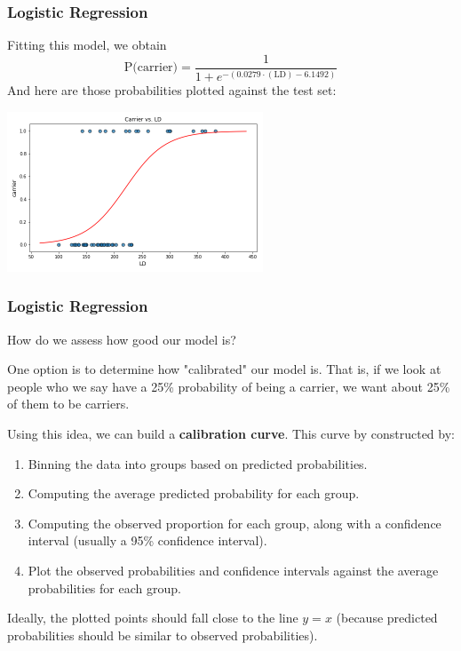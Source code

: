 \documentclass[11pt, table]{beamer}
\begin{document}
\begin{frame}
\frametitle{Logistic Regression}
Fitting this model, we obtain
$$\text{P(carrier)} = \frac{1}{1 + e^{-(0.0279\cdot(\text{LD}) - 6.1492)}}$$
And here are those probabilities plotted against the test set:
\begin{center}
	\includegraphics[width = 3in]{images/Dystrophy/scatter_03.png}
\end{center}

\end{frame}

\begin{frame}
\frametitle{Logistic Regression}
How do we assess how good our model is? 

One option is to determine how "calibrated" our model is. That is, if we look at people who we say have a 25\% probability of being a carrier, we want about 25\% of them to be carriers.
\vspace{0.1in}

Using this idea, we can build a \textbf{calibration curve}. This curve by constructed by:
\begin{enumerate}
	\item Binning the data into groups based on predicted probabilities.
	\item Computing the average predicted probability for each group.
	\item Computing the observed proportion for each group, along with a confidence interval (usually a 95\% confidence interval).
	\item Plot the observed probabilities and confidence intervals against the average probabilities for each group.
\end{enumerate}

Ideally, the plotted points should fall close to the line $y = x$ (because predicted probabilities should be similar to observed probabilities).
\end{frame}
\end{document}

